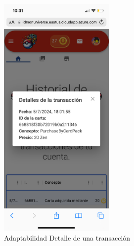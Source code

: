 \begin{figure}[H]
    \centering
    \includegraphics[width=0.5\textwidth]{figures/adaptabilidad/transacciones_2.png}
    \caption{Adaptabilidad Detalle de una transacción}
    \label{fig:Adap-Detalle-Transaccion}
\end{figure}


